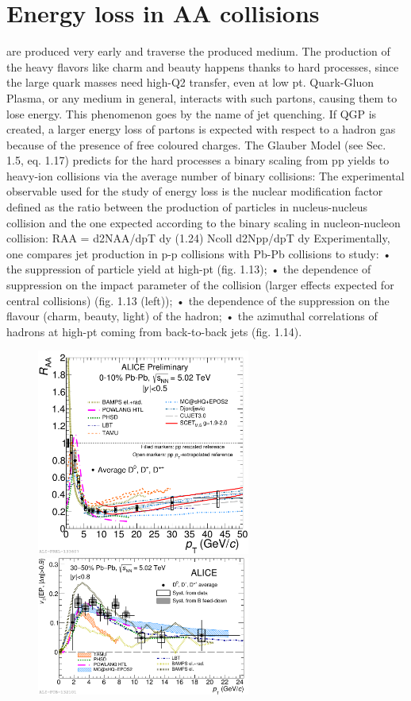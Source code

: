 \section{Energy loss in AA collisions}
are produced very early and traverse the produced medium. The production of the heavy flavors like charm and beauty happens thanks to hard processes, since the large quark masses need high-Q2 transfer, even at low pt. Quark-Gluon Plasma, or any medium in general, interacts with such partons, causing them to lose energy. This phenomenon goes by the name of jet quenching. If QGP is created, a larger energy loss of partons is expected with respect to a hadron gas because of the presence of free coloured charges. The Glauber Model (see Sec. 1.5, eq. 1.17) predicts for the hard processes a binary scaling from pp yields to heavy-ion collisions via the average number
of binary collisions:
The experimental observable used for the study of energy loss is the nuclear modification factor defined as the ratio between the production of particles in nucleus-nucleus collision and the one expected according to the binary scaling in nucleon-nucleon collision:
RAA = d2NAA/dpT dy (1.24) Ncoll d2Npp/dpT dy
Experimentally, one compares jet production in p-p collisions with Pb-Pb collisions to study:
• the suppression of particle yield at high-pt (fig. 1.13);
• the dependence of suppression on the impact parameter of the collision
(larger effects expected for central collisions) (fig. 1.13 (left));
• the dependence of the suppression on the flavour (charm, beauty, light) of the hadron;
• the azimuthal correlations of hadrons at high-pt coming from back-to-back jets (fig. 1.14).
\begin{figure}[!ht]
  \centering
    \includegraphics[width=7cm]{FigCap2/2017-Jul-07-DmesonAverage_010_All_Models_04July2017.pdf}
    \includegraphics[width=7cm]{FigCap2/2017-Jul-04-DmesonComparisonWithModels.pdf}
  \caption{}
  \label{fig:}
\end{figure}

